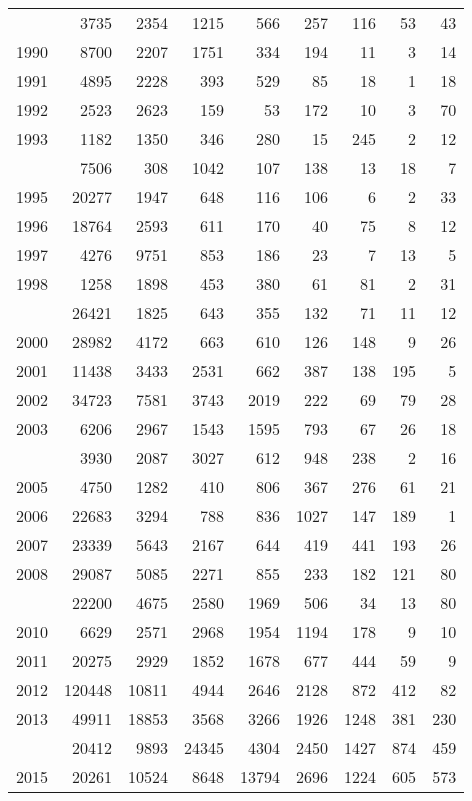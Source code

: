\documentclass[
]{article}
\begin{document}
\begin{longtable}[t]{lrrrrrrrr}
\endfoot
\bottomrule
\endlastfoot
1989 & 3735 & 2354 & 1215 & 566 & 257 & 116 & 53 & 43\\
1990 & 8700 & 2207 & 1751 & 334 & 194 & 11 & 3 & 14\\
1991 & 4895 & 2228 & 393 & 529 & 85 & 18 & 1 & 18\\
1992 & 2523 & 2623 & 159 & 53 & 172 & 10 & 3 & 70\\
1993 & 1182 & 1350 & 346 & 280 & 15 & 245 & 2 & 12\\
\addlinespace
1994 & 7506 & 308 & 1042 & 107 & 138 & 13 & 18 & 7\\
1995 & 20277 & 1947 & 648 & 116 & 106 & 6 & 2 & 33\\
1996 & 18764 & 2593 & 611 & 170 & 40 & 75 & 8 & 12\\
1997 & 4276 & 9751 & 853 & 186 & 23 & 7 & 13 & 5\\
1998 & 1258 & 1898 & 453 & 380 & 61 & 81 & 2 & 31\\
\addlinespace
1999 & 26421 & 1825 & 643 & 355 & 132 & 71 & 11 & 12\\
2000 & 28982 & 4172 & 663 & 610 & 126 & 148 & 9 & 26\\
2001 & 11438 & 3433 & 2531 & 662 & 387 & 138 & 195 & 5\\
2002 & 34723 & 7581 & 3743 & 2019 & 222 & 69 & 79 & 28\\
2003 & 6206 & 2967 & 1543 & 1595 & 793 & 67 & 26 & 18\\
\addlinespace
2004 & 3930 & 2087 & 3027 & 612 & 948 & 238 & 2 & 16\\
2005 & 4750 & 1282 & 410 & 806 & 367 & 276 & 61 & 21\\
2006 & 22683 & 3294 & 788 & 836 & 1027 & 147 & 189 & 1\\
2007 & 23339 & 5643 & 2167 & 644 & 419 & 441 & 193 & 26\\
2008 & 29087 & 5085 & 2271 & 855 & 233 & 182 & 121 & 80\\
\addlinespace
2009 & 22200 & 4675 & 2580 & 1969 & 506 & 34 & 13 & 80\\
2010 & 6629 & 2571 & 2968 & 1954 & 1194 & 178 & 9 & 10\\
2011 & 20275 & 2929 & 1852 & 1678 & 677 & 444 & 59 & 9\\
2012 & 120448 & 10811 & 4944 & 2646 & 2128 & 872 & 412 & 82\\
2013 & 49911 & 18853 & 3568 & 3266 & 1926 & 1248 & 381 & 230\\
\addlinespace
2014 & 20412 & 9893 & 24345 & 4304 & 2450 & 1427 & 874 & 459\\
2015 & 20261 & 10524 & 8648 & 13794 & 2696 & 1224 & 605 & 573\\

\end{longtable}
\end{document}
